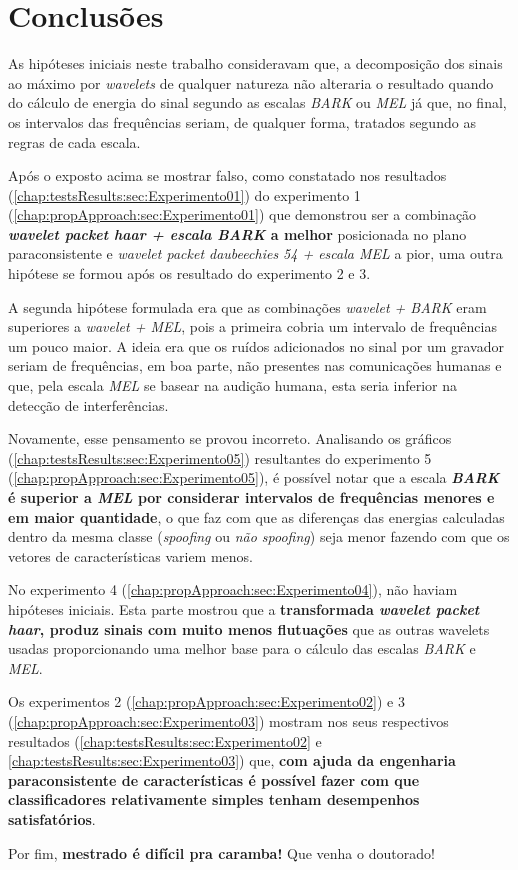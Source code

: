 \chapter{Conclusões}
\label{chap:conclusions}
	\par As hipóteses iniciais neste trabalho consideravam que, a decomposição dos sinais ao máximo por \textit{wavelets} de qualquer natureza não alteraria o resultado quando do cálculo de energia do sinal segundo as escalas \textit{BARK} ou \textit{MEL} já que, no final, os intervalos das frequências seriam, de qualquer forma, tratados segundo as regras de cada escala.
	\par Após o exposto acima se mostrar falso, como constatado nos resultados (\ref{chap:testsResults:sec:Experimento01}) do experimento 1  (\ref{chap:propApproach:sec:Experimento01}) que demonstrou ser a combinação \textbf{\textit{wavelet packet haar + escala BARK} a melhor} posicionada no plano paraconsistente e \textit{wavelet packet daubeechies 54 + escala MEL} a pior, uma outra hipótese se formou após os resultado do experimento 2 e 3.
	\par A segunda hipótese formulada era que as combinações \textit{wavelet + BARK} eram superiores a \textit{wavelet + MEL}, pois a primeira cobria um intervalo de frequências um pouco maior. A ideia era que os ruídos adicionados no sinal por um gravador seriam de frequências, em boa parte, não presentes nas comunicações humanas e que, pela escala \textit{MEL} se basear na audição humana, esta seria inferior na detecção de interferências.
	\par Novamente, esse pensamento se provou incorreto. Analisando os gráficos (\ref{chap:testsResults:sec:Experimento05}) resultantes do experimento 5 (\ref{chap:propApproach:sec:Experimento05}), é possível notar que a escala \textbf{\textit{BARK} é superior a \textit{MEL} por considerar intervalos de frequências menores e em maior quantidade}, o que faz com que as diferenças das energias calculadas dentro da mesma classe (\textit{spoofing} ou \textit{não spoofing}) seja menor fazendo com que os vetores de características variem menos.
	\par No experimento 4 (\ref{chap:propApproach:sec:Experimento04}), não haviam hipóteses iniciais. Esta parte mostrou que a \textbf{transformada \textit{wavelet packet haar}, produz sinais com muito menos flutuações} que as outras wavelets usadas proporcionando uma melhor base para o cálculo das escalas \textit{BARK} e \textit{MEL}.
	\par Os experimentos 2 (\ref{chap:propApproach:sec:Experimento02}) e 3 (\ref{chap:propApproach:sec:Experimento03}) mostram nos seus respectivos resultados (\ref{chap:testsResults:sec:Experimento02} e \ref{chap:testsResults:sec:Experimento03}) que, \textbf{com ajuda da engenharia paraconsistente de características é possível fazer com que classificadores relativamente simples tenham desempenhos satisfatórios}.
	\par Por fim, \textbf{mestrado é difícil pra caramba!} Que venha o doutorado!